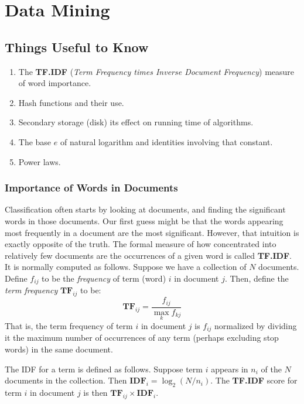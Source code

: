 \chapter{Data Mining}\label{chap:data-mining}

\section{Things Useful to Know}\label{sec:things-useful-to-know}

\begin{enumerate}
    \item The \textbf{TF.IDF} (\textit{Term Frequency times Inverse Document Frequency}) measure of word importance.
    \item Hash functions and their use.
    \item Secondary storage (disk) its effect on running time of algorithms.
    \item The base $e$ of natural logarithm and identities involving that constant.
    \item Power laws.
\end{enumerate}

\subsection{Importance of Words in Documents}\label{subsec:importance-of-words-in-documents}

Classification often starts by looking at documents, and finding the significant words in those documents. Our first guess might be that the words appearing most frequently in a document are the most significant. However, that intuition is exactly opposite of the truth. The formal measure of how concentrated into relatively few documents are the occurrences of a given word is called \textbf{TF.IDF}. It is normally computed as follows. Suppose we have a collection of $N$ documents. Define $f_{ij}$ to be the \textit{frequency} of term (word) $i$ in document $j$. Then, define the \textit{term frequency} $\bm{TF}_{ij}$ to be:
\begin{equation*}\label{eq:tf}
    \bm{TF}_{ij} = \frac{f_{ij}}{\max_{k} f_{kj}}
\end{equation*}
That is, the term frequency of term $i$ in document $j$ is $f_{ij}$ normalized by dividing it the maximum number of occurrences of any term (perhaps excluding stop words) in the same document.

The IDF for a term is defined as follows. Suppose term $i$ appears in $n_i$ of the $N$ documents in the collection. Then $\bm{IDF}_i = \log_2(N/n_i)$. The \textbf{TF.IDF} score for term $i$ in document $j$ is then $\bm{TF}_{ij} \times \bm{IDF}_i$.

